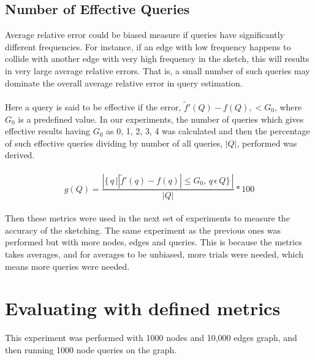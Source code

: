 \documentclass[12pt]{report}
\numberwithin{figure}{section}
\numberwithin{table}{section}
\begin{document}
\subsection{Number of Effective Queries}
Average relative error could be biased measure if queries have significantly different frequencies. For instance, if an edge with low frequency happens to collide with another edge with very high frequency in the sketch, this will results in very large average relative errors. That is, a small number of such queries may dominate the overall average relative error in query estimation.

\paragraph{}

Here a query is said to be effective if the error, $\tilde{f}'(Q) - f(Q), < G_0$,  where $G_0$ is a predefined value. In our experiments, the number of queries which gives effective results having $G_0$ as 0, 1, 2, 3, 4 was calculated and then the percentage of such effective queries dividing by number of all queries, $|Q|$, performed was derived. 

\paragraph{}

\begin{equation}
g(Q) =  \frac{\left | \{\,q\, |   \left |\tilde{f}'(q) - f(q)\right | \leq G_0, \,q \, \epsilon  \,Q\} \, \right|}{|Q|}*100
\end{equation}

\paragraph{}
 
Then these metrics were used in the next set of experiments to measure the accuracy of the sketching. The same experiment as the previous ones was performed but with more nodes, edges and queries. This is because the metrics takes averages, and for averages to be unbiased, more trials were needed, which means more queries were needed.

\section{Evaluating with defined metrics}

This experiment was performed with 1000 nodes and 10,000 edges graph, and then running 1000 node queries on the graph.
\end{document}
